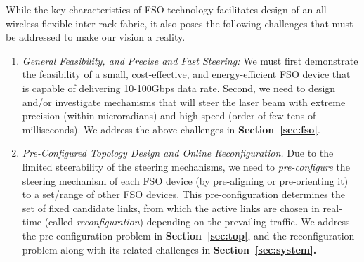  While the key
characteristics of FSO technology facilitates design of an
all-wireless flexible inter-rack fabric, it also poses the following
challenges that must be addressed to make our vision a reality.

\begin{enumerate}
\item
{\em General Feasibility, and Precise and Fast Steering:}
  We must first demonstrate the feasibility of a small,
  cost-effective, and energy-efficient FSO device that is capable of
  delivering 10-100Gbps data rate. Second, we need to design and/or
  investigate mechanisms that will steer the laser beam with extreme
  precision (within microradians) and high speed (order of few tens of
  milliseconds). We address the above challenges in {\bf Section~\ref{sec:fso}}.

\item
{\em Pre-Configured Topology Design and Online Reconfiguration.}  Due
to the limited steerability of the  steering
mechanisms, we need to {\em pre-configure} the steering mechanism of
each FSO device (by pre-aligning or pre-orienting it) to a set/range
of other FSO devices. This pre-configuration determines the set of
fixed candidate links, from which the active links are chosen in
real-time (called {\em reconfiguration}) depending on the prevailing
traffic. We address the pre-configuration problem in {\bf
  Section~\ref{sec:top}}, and the reconfiguration problem along with
its related challenges in \bf{Section~\ref{sec:system}.}
\end{enumerate}
